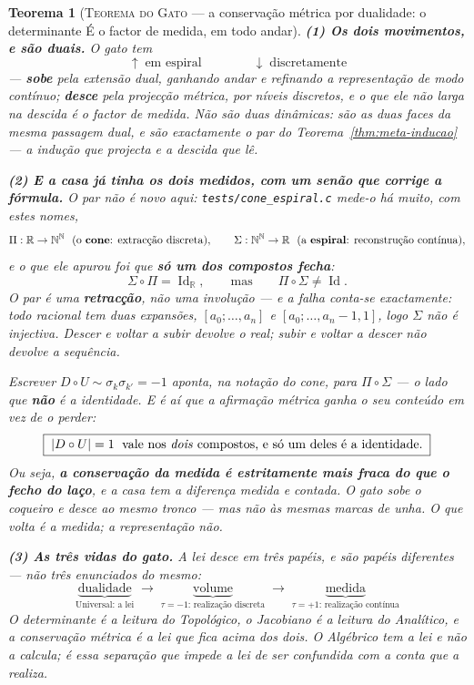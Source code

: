 \documentclass[11pt,a4paper]{article}
\newtheorem{teorema}{Teorema}
\newcommand{\code}[1]{\texttt{\small #1}}
\begin{document}
\begin{teorema}[\textsc{Teorema do Gato} --- a conservação métrica por
dualidade: o determinante É o factor de medida, em todo
andar]
\textbf{(1) Os dois movimentos, e são duais.} O gato tem
\[
\boxed{\;\uparrow\;\text{em espiral}
\qquad\qquad
\downarrow\;\text{discretamente}\;}
\]
--- \textbf{sobe} pela extensão dual, ganhando andar e refinando a
representação de modo \emph{contínuo}; \textbf{desce} pela projecção
métrica, por níveis \emph{discretos}, e o que ele não larga na descida é
o factor de medida. Não são duas dinâmicas: são as duas faces da mesma
passagem dual, e são exactamente o par do
Teorema~\ref{thm:meta-inducao} --- a indução que projecta e a descida que
lê.

\textbf{(2) E a casa já tinha os dois medidos, com um senão que corrige
a fórmula.} O par não é novo aqui: \code{tests/cone\_espiral.c} mede-o há
muito, com estes nomes,
\[
\Pi:\mathbb{R}\to\mathbb{N}^{\mathbb{N}}\ \ (\text{o \textbf{cone}:
extracção discreta}),
\qquad
\Sigma:\mathbb{N}^{\mathbb{N}}\to\mathbb{R}\ \ (\text{a \textbf{espiral}:
reconstrução contínua}),
\]
e o que ele apurou foi que \textbf{só um dos compostos fecha}:
\[
\Sigma\circ\Pi=\operatorname{Id}_{\mathbb{R}},
\qquad\text{mas}\qquad
\Pi\circ\Sigma\neq\operatorname{Id}.
\]
O par é uma \textbf{retracção}, não uma involução --- e a falha conta-se
exactamente: todo racional tem \emph{duas} expansões,
$[a_{0};\ldots,a_{n}]$ e $[a_{0};\ldots,a_{n}-1,1]$, logo $\Sigma$ não é
injectiva. Descer e voltar a subir devolve o real; subir e voltar a
descer \emph{não} devolve a sequência.

Escrever $D\circ U\sim\sigma_{k}\sigma_{k'}=-1$ aponta, na notação do
cone, para $\Pi\circ\Sigma$ --- o lado que \textbf{não} é a identidade. E
é aí que a afirmação métrica ganha o seu conteúdo em vez de o perder:
\[
\boxed{\;|D\circ U|=1\;\text{ vale nos \emph{dois} compostos, e só um
deles é a identidade.}\;}
\]
Ou seja, \textbf{a conservação da medida é estritamente mais fraca do que
o fecho do laço}, e a casa tem a diferença medida e contada. O gato sobe
o coqueiro e desce ao mesmo tronco --- mas não às mesmas marcas de unha.
O que volta é a \emph{medida}; a representação não.

\textbf{(3) As três vidas do gato.} A lei desce em três papéis, e são
papéis \emph{diferentes} --- não três enunciados do mesmo:
\[
\boxed{\;
\underbrace{\text{dualidade}}_{\text{Universal: a lei}}
\;\longrightarrow\;
\underbrace{\text{volume}}_{\text{$\tau=-1$: realização discreta}}
\;\longrightarrow\;
\underbrace{\text{medida}}_{\text{$\tau=+1$: realização contínua}}\;}
\]
O determinante é a leitura do Topológico, o Jacobiano é a leitura do Analítico, e a
conservação métrica é a lei que fica acima dos dois. O Algébrico tem a
lei e \emph{não a calcula}; é essa separação que impede a lei de ser
confundida com a conta que a realiza.


\end{teorema}
\end{document}
